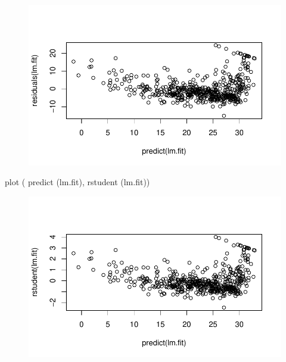 \documentclass[
  letterpaper,
  DIV=11,
  numbers=noendperiod]{scrartcl}
\newenvironment{Shaded}{\begin{snugshade}}{\end{snugshade}}
\newcommand{\FunctionTok}[1]{\textcolor[rgb]{0.28,0.35,0.67}{#1}}
\newcommand{\NormalTok}[1]{\textcolor[rgb]{0.00,0.23,0.31}{#1}}
\begin{document}
\begin{figure}[H]

{\centering \includegraphics{Resumen-2---3_files/figure-pdf/unnamed-chunk-11-1.pdf}

}

\end{figure}

\begin{Shaded}
\begin{Highlighting}[]
\FunctionTok{plot}\NormalTok{ ( }\FunctionTok{predict}\NormalTok{ (lm.fit), }\FunctionTok{rstudent}\NormalTok{ (lm.fit))}
\end{Highlighting}
\end{Shaded}

\begin{figure}[H]

{\centering \includegraphics{Resumen-2---3_files/figure-pdf/unnamed-chunk-11-2.pdf}

}

\end{figure}
\end{document}
